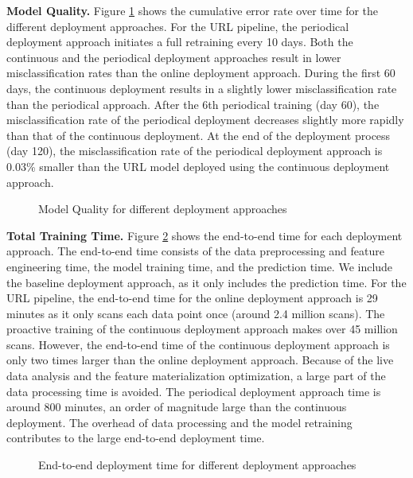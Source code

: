 \textbf{Model Quality. }
Figure \ref{deployment-quality-figure} shows the cumulative error rate over time for the different deployment approaches.
For the URL pipeline, the periodical deployment approach initiates a full retraining every 10 days.
Both the continuous and the periodical deployment approaches result in lower misclassification rates than the online deployment approach.
During the first 60 days, the continuous deployment results in a slightly lower misclassification rate than the periodical approach.
After the 6th periodical training (day 60), the misclassification rate of the periodical deployment decreases slightly more rapidly than that of the continuous deployment. 
At the end of the deployment process (day 120), the misclassification rate of the periodical deployment approach is 0.03\% smaller than the URL model deployed using the continuous deployment approach.
\begin{figure}[h!]
\centering
\resizebox{\columnwidth}{!}{}
\caption{Model Quality for different deployment approaches}
\label{deployment-quality-figure}
\end{figure}

\textbf{Total Training Time. }
Figure \ref{deployment-time-figure} shows the end-to-end  time for each deployment approach.
The end-to-end time consists of the data preprocessing and feature engineering time, the model training time, and the prediction time. 
We include the baseline deployment approach, as it only includes the prediction time.
For the URL pipeline, the end-to-end time for the online deployment approach is 29 minutes as it only scans each data point once (around 2.4 million scans).  
The proactive training of the continuous deployment approach makes over 45 million scans.
However, the end-to-end time of the continuous deployment approach is only two times larger than the online deployment approach. 
Because of the live data analysis and the feature materialization optimization, a large part of the data processing time is avoided.
The periodical deployment approach time is around 800 minutes, an order of magnitude large than the continuous deployment. 
The overhead of data processing and the model retraining contributes to the large end-to-end deployment time.
\begin{figure}[h!]
\centering
\resizebox{\columnwidth}{!}{}
\caption{End-to-end deployment time for different deployment approaches}
\label{deployment-time-figure}
\end{figure}

